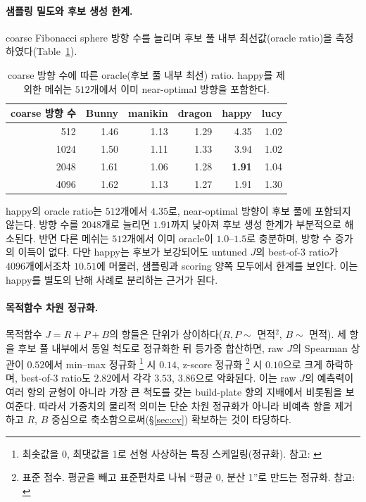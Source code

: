 \documentclass[11pt,a4paper]{article}
\begin{document}
\paragraph{샘플링 밀도와 후보 생성 한계.}
coarse Fibonacci sphere 방향 수를 늘리며 후보 풀 내부 최선값(oracle ratio)을 측정하였다(Table~\ref{tab:sampling}).

\begin{table}[H]
\centering
\caption{coarse 방향 수에 따른 oracle(후보 풀 내부 최선) ratio. happy를 제외한 메쉬는
$512$개에서 이미 near-optimal 방향을 포함한다.}
\label{tab:sampling}
\begin{tabular}{rrrrrr}
\toprule
coarse 방향 수 & Bunny & manikin & dragon & happy & lucy\\
\midrule
512  & 1.46 & 1.13 & 1.29 & 4.35 & 1.02\\
1024 & 1.50 & 1.11 & 1.33 & 3.94 & 1.02\\
2048 & 1.61 & 1.06 & 1.28 & \textbf{1.91} & 1.04\\
4096 & 1.62 & 1.13 & 1.27 & 1.91 & 1.30\\
\bottomrule
\end{tabular}
\end{table}

happy의 oracle ratio는 $512$개에서 $4.35$로, near-optimal 방향이 후보 풀에 포함되지 않는다.
방향 수를 $2048$개로 늘리면 $1.91$까지 낮아져 후보 생성 한계가 부분적으로 해소된다.
반면 다른 메쉬는 $512$개에서 이미 oracle이 $1.0$--$1.5$로 충분하며, 방향 수 증가의 이득이 없다.
다만 happy는 후보가 보강되어도 untuned $J$의 best-of-3 ratio가 $4096$개에서조차 $10.51$에 머물러,
샘플링과 scoring 양쪽 모두에서 한계를 보인다. 이는 happy를 별도의 난해 사례로 분리하는 근거가 된다.

\paragraph{목적함수 차원 정규화.}
목적함수 $J=R+P+B$의 항들은 단위가 상이하다($R,P\sim$ 면적$^2$, $B\sim$ 면적).
세 항을 후보 풀 내부에서 동일 척도로 정규화한 뒤 등가중 합산하면,
raw $J$의 Spearman 상관이 $0.52$에서 min--max 정규화%
\footnote{최솟값을 0, 최댓값을 1로 선형 사상하는 특징 스케일링(정규화). 참고: \cite{hanmining}}
시 $0.14$, z-score 정규화%
\footnote{표준 점수. 평균을 빼고 표준편차로 나눠 ``평균 0, 분산 1''로 만드는 정규화.
참고: \cite{hanmining}}
시 $0.10$으로 크게 하락하며,
best-of-3 ratio도 $2.82$에서 각각 $3.53$, $3.86$으로 악화된다.
이는 raw $J$의 예측력이 여러 항의 균형이 아니라 가장 큰 척도를 갖는 build-plate 항의 지배에서 비롯됨을 보여준다.
따라서 가중치의 물리적 의미는 단순 차원 정규화가 아니라
비예측 항을 제거하고 $R$, $B$ 중심으로 축소함으로써(\S\ref{sec:cv}) 확보하는 것이 타당하다.
\end{document}
